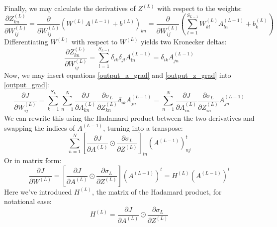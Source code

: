 \documentclass[12pt, a4paper]{article}
\numberwithin{equation}{section}
\begin{document}
Finally, we may calculate the derivatives of $Z^{(L)}$ with respect to the weights:
\begin{equation}
\frac{\partial Z^{(L)}_{kn}}{\partial W^{(L)}_{ij}}=\frac{\partial}{\partial W^{(L)}_{ij}}(W^{(L)}A^{(L-1)}+b^{(L)})_{kn}=\frac{\partial}{\partial W^{(L)}_{ij}}\left(\sum_{l=1}^{S_{L-1}}W^{(L)}_{kl}A^{(L-1)}_{ln}+b^{(L)}_k\right)
\end{equation}
Differentiating $W^{(L)}$ with respect to $W^{(L)}$ yields two Kronecker deltas:
\begin{equation}
\label{output_z_grad}
\frac{\partial Z^{(L)}_{kn}}{\partial W^{(L)}_{ij}}=\sum_{l=1}^{S_{L-1}}\delta_{ik}\delta_{jl}A^{(L-1)}_{ln}=\delta_{ik} A^{(L-1)}_{jn}
\end{equation}
Now, we may insert equations \ref{output_a_grad} and \ref{output_z_grad} into \ref{output_grad}:
\begin{equation}
\frac{\partial J}{\partial W^{(L)}_{ij}}=\sum_{k=1}^{S_L}\sum_{n=1}^N\frac{\partial J}{\partial A^{(L)}_{kn}}\frac{\partial\sigma_L}{\partial Z^{(L)}_{kn}}\delta_{ik} A^{(L-1)}_{jn}=\sum_{n=1}^N\frac{\partial J}{\partial A^{(L)}_{in}}\frac{\partial\sigma_L}{\partial Z^{(L)}_{in}}A^{(L-1)}_{jn}
\end{equation}
We can rewrite this using the Hadamard product between the two derivatives and swapping the indices of $A^{(L-1)}$, turning into a transpose:
\begin{equation}
\sum_{n=1}^N\left[\frac{\partial J}{\partial A^{(L)}}\odot\frac{\partial\sigma_L}{\partial Z^{(L)}}\right]_{in}\left(A^{(L-1)}\right)^t_{nj}
\end{equation}
Or in matrix form:
\begin{equation}
\label{output_weights_matrix}
\frac{\partial J}{\partial W^{(L)}}=\left[\frac{\partial J}{\partial A^{(L)}}\odot\frac{\partial\sigma_L}{\partial Z^{(L)}}\right]\left(A^{(L-1)}\right)^t=H^{(L)}\left(A^{(L-1)}\right)^t
\end{equation}
Here we've introduced $H^{(L)}$, the matrix of the Hadamard product, for notational ease:
\begin{equation}
H^{(L)}=\frac{\partial J}{\partial A^{(L)}}\odot\frac{\partial\sigma_L}{\partial Z^{(L)}}
\end{equation}
\end{document}
